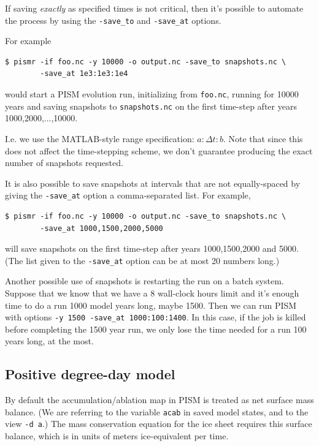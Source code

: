 \documentclass[11pt,final]{amsart}
\begin{document}
If saving \emph{exactly} as specified times is not critical, then it's possible
to automate the process by using the \verb|-save_to| and \verb|-save_at|
options.

For example
\begin{verbatim}
$ pismr -if foo.nc -y 10000 -o output.nc -save_to snapshots.nc \
        -save_at 1e3:1e3:1e4
\end{verbatim}
would start a PISM evolution run, initializing from \verb|foo.nc|, running for
10000 years and saving snapshots to \verb|snapshots.nc| on the first time-step
after years 1000,2000,...,10000.

I.e. we use the MATLAB-style range specification: $a:\Delta t:b$. Note that
since this does not affect the time-stepping scheme, we don't guarantee
producing the exact number of snapshots requested.

It is also possible to save snapshots at intervals that are not equally-spaced
by giving the \verb|-save_at| option a comma-separated list. For example,
\begin{verbatim}
$ pismr -if foo.nc -y 10000 -o output.nc -save_to snapshots.nc \
        -save_at 1000,1500,2000,5000
\end{verbatim}
will save snapshots on the first time-step after years 1000,1500,2000 and 5000.
(The list given to the \verb|-save_at| option can be at most 20 numbers long.)

Another possible use of snapshots is restarting the run on a batch system.
Suppose that we know that we have a 8 wall-clock hours limit and it's enough
time to do a run 1000 model years long, maybe 1500. Then we can run PISM with
options \verb|-y 1500 -save_at 1000:100:1400|. In this case, if the job is
killed before completing the 1500 year run, we only lose the time needed for a
run 100 years long, at the most.

\subsection{Positive degree-day model}  \label{subsect:pdd}     By default the accumulation/ablation map in PISM is treated as net surface mass balance.  (We are referring to the variable \verb|acab| in saved model states, and to the view \verb|-d a|.)  The mass conservation equation for the ice sheet requires this surface balance, which is in units of meters ice-equivalent per time.
\end{document}
